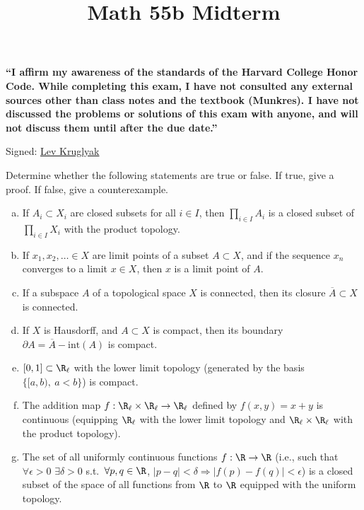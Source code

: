 \documentclass[11pt,letterpaper]{article}
\title{\textbf{Math 55b Midterm}}
\begin{document}
\maketitle

{\bf ``I affirm my awareness of the standards of the Harvard College Honor
Code. While completing this exam, I have not consulted any external sources other than class notes
and the textbook (Munkres). I have not discussed the problems or solutions of this
exam with anyone, and will not discuss them until after the due date.''
\bigskip

Signed: \underline{\quad Lev Kruglyak\quad}}
\bigskip

\pagebreak
\begin{problem}[14 points]
    Determine whether the following statements are true or false. If true, give a proof. If false, give a counterexample.
    \begin{enumerate}[(a)]
        \item If $A_i\subset X_i$ are closed subsets for all $i\in I$, then $\prod_{i\in I} A_i$ is a closed subset of $\prod_{i\in I} X_i$ with the product topology.
        \item If $x_1,x_2,\dots\in X$ are limit points of a subset $A\subset X$, and if the sequence $x_n$ converges to a limit $x\in X$, then $x$ is a limit point of $A$.
        \item If a subspace $A$ of a topological space $X$ is connected, then its closure $\overline{A}\subset X$ is connected. 
        \item If $X$ is Hausdorff, and $A\subset X$ is compact, then its boundary $\partial A=\overline{A}-\mathrm{int}(A)$ is compact.
        \item $[0,1]\subset \R_\ell$ with the lower limit topology (generated by the basis $\{[a,b),\ a<b\}$) is compact.
        \item The addition map $f:\R_\ell \times \R_\ell \to \R_\ell$ defined by $f(x,y)=x+y$ is continuous (equipping $\R_\ell$ with the lower limit topology and $\R_\ell\times\R_\ell$ with the product topology).
        \item The set of all uniformly continuous functions $f:\R\to\R$ (i.e., such that $\forall \epsilon>0$ $\exists \delta>0$ s.t.\ $\forall p,q\in \R$, $|p-q|<\delta \Rightarrow |f(p)-f(q)|<\epsilon$) is a closed subset of the space of all functions from $\R$ to $\R$ equipped with the uniform topology.
    \end{enumerate}
\end{problem}
\end{document}
